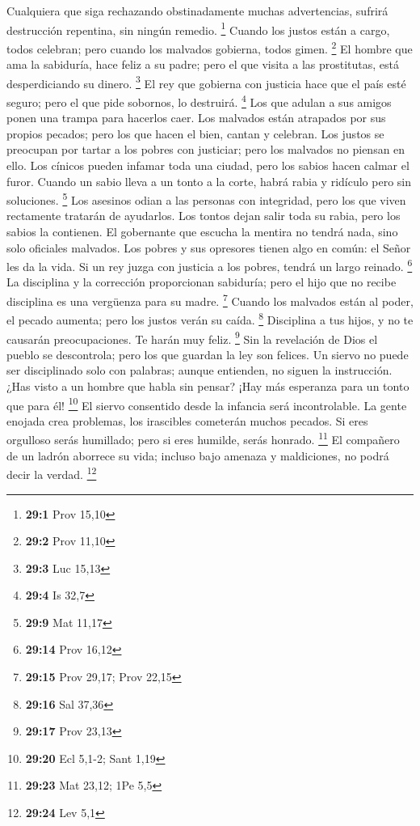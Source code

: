  Cualquiera que siga rechazando obstinadamente muchas
advertencias, sufrirá destrucción repentina, sin ningún remedio.
\footnote{\textbf{29:1} Prov 15,10}  Cuando los justos están
a cargo, todos celebran; pero cuando los malvados gobierna, todos gimen.
\footnote{\textbf{29:2} Prov 11,10}  El hombre que ama la
sabiduría, hace feliz a su padre; pero el que visita a las prostitutas,
está desperdiciando su dinero. \footnote{\textbf{29:3} Luc 15,13}
 El rey que gobierna con justicia hace que el país esté
seguro; pero el que pide sobornos, lo destruirá. \footnote{\textbf{29:4}
  Is 32,7}  Los que adulan a sus amigos ponen una trampa
para hacerlos caer.  Los malvados están atrapados por sus
propios pecados; pero los que hacen el bien, cantan y celebran.
 Los justos se preocupan por tartar a los pobres con
justiciar; pero los malvados no piensan en ello.  Los
cínicos pueden infamar toda una ciudad, pero los sabios hacen calmar el
furor.  Cuando un sabio lleva a un tonto a la corte, habrá
rabia y ridículo pero sin soluciones. \footnote{\textbf{29:9} Mat 11,17}
 Los asesinos odian a las personas con integridad, pero los
que viven rectamente tratarán de ayudarlos.  Los tontos
dejan salir toda su rabia, pero los sabios la contienen. 
El gobernante que escucha la mentira no tendrá nada, sino solo oficiales
malvados.  Los pobres y sus opresores tienen algo en común:
el Señor les da la vida.  Si un rey juzga con justicia a
los pobres, tendrá un largo reinado. \footnote{\textbf{29:14} Prov 16,12}
 La disciplina y la corrección proporcionan sabiduría; pero
el hijo que no recibe disciplina es una vergüenza para su madre.
\footnote{\textbf{29:15} Prov 29,17; Prov 22,15}  Cuando
los malvados están al poder, el pecado aumenta; pero los justos verán su
caída. \footnote{\textbf{29:16} Sal 37,36}  Disciplina a
tus hijos, y no te causarán preocupaciones. Te harán muy feliz.
\footnote{\textbf{29:17} Prov 23,13}  Sin la revelación de
Dios el pueblo se descontrola; pero los que guardan la ley son felices.
 Un siervo no puede ser disciplinado solo con palabras;
aunque entienden, no siguen la instrucción.  ¿Has visto a
un hombre que habla sin pensar? ¡Hay más esperanza para un tonto que
para él! \footnote{\textbf{29:20} Ecl 5,1-2; Sant 1,19}  El
siervo consentido desde la infancia será incontrolable.  La
gente enojada crea problemas, los irascibles cometerán muchos pecados.
 Si eres orgulloso serás humillado; pero si eres humilde,
serás honrado. \footnote{\textbf{29:23} Mat 23,12; 1Pe 5,5}
 El compañero de un ladrón aborrece su vida; incluso bajo
amenaza y maldiciones, no podrá decir la verdad. \footnote{\textbf{29:24}
  Lev 5,1}

